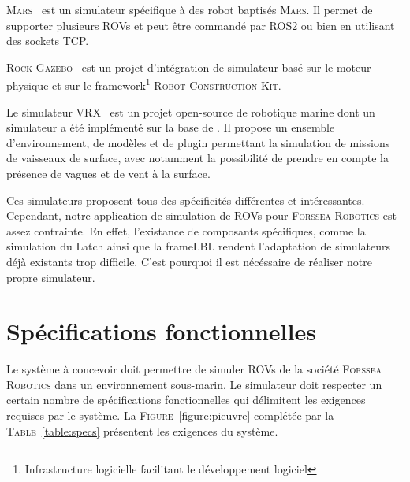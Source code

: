        \textsc{Mars}~\cite{MARS} est un simulateur spécifique à des robot baptisés \textsc{Mars}. Il permet de supporter plusieurs \gls{ROV}s et peut être commandé par \gls{ROS2} ou bien en utilisant des sockets TCP.
        
        \textsc{Rock-Gazebo}~\cite{Rock} est un projet d'intégration de simulateur basé sur le moteur physique \gazebo{} et sur le framework\footnote{Infrastructure logicielle facilitant le développement logiciel} \textsc{Robot Construction Kit}.
        
        Le simulateur \textsc{VRX}~\cite{bingham19toward} est un projet open-source de robotique marine dont un simulateur a été implémenté sur la base de \gazebo{}. Il propose un ensemble d'environnement, de modèles et de plugin permettant la simulation de missions de vaisseaux de surface, avec notamment la possibilité de prendre en compte la présence de vagues et de vent à la surface.

        Ces simulateurs proposent tous des spécificités différentes et intéressantes. Cependant, notre application de simulation de \gls{ROV}s pour \textsc{Forssea Robotics} est assez contrainte. En effet, l'existance de composants spécifiques, comme la simulation du \gls{Latch} ainsi que la \gls{frameLBL} rendent l'adaptation de simulateurs déjà existants trop difficile. C'est pourquoi il est nécéssaire de réaliser notre propre simulateur.

    \section{Spécifications fonctionnelles}
        \label{sec:spec_fonc}

        Le système à concevoir doit permettre de simuler \gls{ROV}s de la société \textsc{Forssea Robotics} dans un environnement sous-marin. Le simulateur doit respecter un certain nombre de spécifications fonctionnelles qui délimitent les exigences requises par le système. La \textsc{Figure}~\ref{figure:pieuvre} complétée par la \textsc{Table}~\ref{table:specs} présentent les exigences du système.

